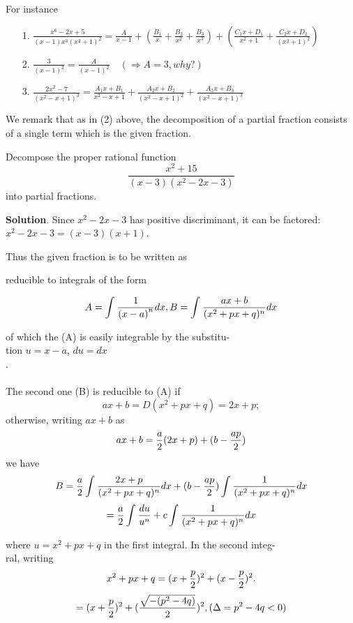 \documentclass[11pt]{amsbook}
\begin{document}
For instance
\begin{enumerate}

	\item[1.]
 	$\frac{x^6-2x+5}{(x-1)x^3(x^2+1)^2} = \frac{A}{x-1} + (\frac{B_1}{x}+\frac{B_2}{x^2}+\frac{B_3}{x^3})+(\frac{C_1x+D_1}{x^2+1}+\frac{C_2x+D_2}{(x^2+1)^2})$

	\item[2.] 
	$\frac{3}{(x-1)^2}= \frac{A}{(x-1)^2} \quad (\Rightarrow A=3, why?)$
	
	\item [3.] 
	$\frac{2x^2-7}{(x^2-x+1)^3}=\frac{A_1x+B_1}{x^2-x+1}+\frac{A_2x+B_2}{(x^2-x+1)^2}+\frac{A_3x+B_3}{(x^2-x+1)^3}$

\end{enumerate}

We remark that as in (2) above, the decomposition of a partial fraction consists of a single term which is the given fraction.

\begin{exmp}
	Decompose the proper rational function
	\[
		\frac{x^2+15}{(x-3)(x^2-2x-3)}
	\]
	into partial fractions.
\end{exmp}

\textbf{Solution}. Since $x^2-2x-3$ has positive discriminant, it can be factored:  $x^2-2x-3 = (x-3)(x+1)$.

Thus the given fraction is to be written as

 reducible to integrals of the form
    
    $$A = \int_{}^{} {{1}\over{{(x-a)}^n}} dx, B = \int_{}^{} {{ax+b}\over{({x^2+px+q})^n}} dx$$
    
    of which the (A) is easily integrable by the substitu-\\
    tion $u=x-a$, $du=dx$\\.
    \paragraph{} The second one (B) is reducible to (A) if \\
    $$ax+b=D(x^2+px+q)=2x+p;$$
    otherwise, writing $ax+b$ as
    $$ax+b={{a}\over{2}}(2x+p) + (b- {{ap}\over{2}})$$
    we have
    $$B={{a}\over{2}}\int_{}^{} {{2x+p}\over{(x^2+px+q)^n}}dx+(b-{{ap}\over{2}})\int_{}^{}{1\over{(x^2+px+q)^n}}dx$$
    $$={{{a}\over{2}}\int_{}^{}{{du}\over{u^n}}+c\int_{}^{}{1\over{(x^2+px+q)^n}}dx}$$
    
    where $u=x^2+px+q$ in the first integral. In the second integ-\\
    ral, writing
    $$x^2+px+q=(x+{{p}\over{2}})^2+(x-{{p}\over{2}})^2.$$
    $$={{(x+{{p}\over{2}})^2}+{({{\sqrt{-(p^2-4q)}}\over{2}})^2}}, (\Delta=p^2-4q<0)$$
    
\end{document}
